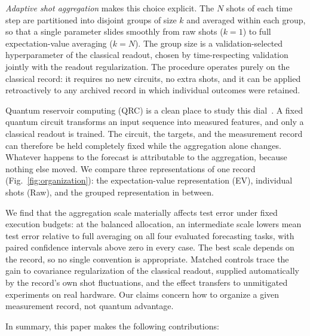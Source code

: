 \emph{Adaptive shot aggregation} makes this choice explicit. The $N$ shots of
each time step are partitioned into disjoint groups of size $k$ and averaged
within each group, so that a single parameter slides smoothly from raw shots
($k=1$) to full expectation-value averaging ($k=N$). The group size is a
validation-selected hyperparameter of the classical readout, chosen by
time-respecting validation jointly with the readout regularization. The
procedure operates purely on the classical record: it requires no new circuits,
no extra shots, and it can be applied retroactively to any archived record in
which individual outcomes were retained.

Quantum reservoir computing (QRC) is a clean place to study this
dial~\cite{fujii2017harnessing,nakajima2019boosting,mujal2021opportunities}. A
fixed quantum circuit transforms an input sequence into measured features, and
only a classical readout is trained. The circuit, the targets, and the
measurement record can therefore be held completely fixed while the aggregation
alone changes. Whatever happens to the forecast is attributable to the
aggregation, because nothing else moved. We compare three representations of
one record (Fig.~\ref{fig:organization}): the expectation-value representation
(EV), individual shots (Raw), and the grouped representation in between.

We find that the aggregation scale materially affects test error under fixed
execution budgets: at the balanced allocation, an intermediate scale lowers
mean test error relative to full averaging on all four evaluated forecasting
tasks, with paired confidence intervals above zero in every case. The best scale
depends on the record, so no single convention is appropriate. Matched controls
trace the gain to covariance regularization of the classical readout, supplied
automatically by the record's own shot fluctuations, and the effect transfers
to unmitigated experiments on real hardware. Our claims concern how to organize
a given measurement record, not quantum advantage.

In summary, this paper makes the following contributions:

